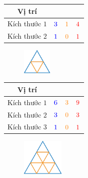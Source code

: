 \begin{multicols}{2}
	\begin{table}[H]
		\setlength{\tabcolsep}{2pt}
		\renewcommand{\arraystretch}{1.3}
		\begin{tabular}{|c|c|c|c|}
			\hline
			Vị trí & {\color{blue}{Lên}}  & {\color{orange}{Xuống}} & {\color{red}{Tổng}}\\
			\hline
			Kích thước $1$ & ${\color{blue}{3}}$ &${\color{orange}{1}}$ & ${\color{red}{4}}$\\
			\hline
			Kích thước $2$ & ${\color{blue}{1}}$ & ${\color{orange}{0}}$ & ${\color{red}{1}}$ \\
			\hline
		\end{tabular}
	\end{table}
	\begin{figure}[H]
		\vspace*{-5pt}
		\centering
		\captionsetup{labelformat= empty, justification=centering}
		\includegraphics[width=0.125\textwidth]{Hinh23_1}
		\caption{}
		\vspace*{-5pt}
	\end{figure}
\end{multicols}
\begin{multicols}{2}
	\begin{table}[H]
		\setlength{\tabcolsep}{2pt}
		\renewcommand{\arraystretch}{1.3}
		\begin{tabular}{|c|c|c|c|}
			\hline
			Vị trí & {\color{blue}{Lên}}  & {\color{orange}{Xuống}} & {\color{red}{Tổng}}\\
			\hline
			Kích thước $1$  & ${\color{blue}{6}}$ &${\color{orange}{ 3}}$ &${\color{red}{9}}$ \\
			\hline
			Kích thước $2$  & ${\color{blue}{3}}$ & ${\color{orange}{0}}$ & ${\color{red}{3}}$ \\
			\hline
			Kích thước $3$  & ${\color{blue}{1}}$ & ${\color{orange}{0}}$ & ${\color{red}{1}}$ \\
			\hline
		\end{tabular}
	\end{table}
	\begin{figure}[H]
		\centering
		\captionsetup{labelformat= empty, justification=centering}
		\includegraphics[width=0.18\textwidth]{Hinh24_1}
		\caption{}
		\vspace*{-10pt}
	\end{figure}
\end{multicols}
